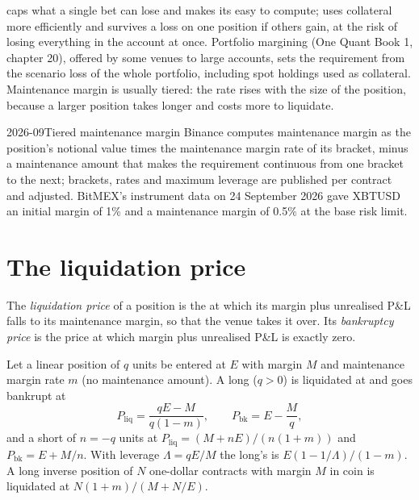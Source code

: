  caps what a single bet can lose and makes its  easy to compute; 
uses collateral more efficiently and survives a loss on one position if others gain, at the risk of losing
everything in the account at once. Portfolio margining (One Quant Book 1, chapter 20), offered by some venues
to large accounts, sets the requirement from the scenario loss of the whole portfolio, including spot holdings
used as collateral. Maintenance margin is usually tiered: the rate rises with the size of the position, because
a larger position takes longer and costs more to liquidate.

\begin{dated}{2026-09}{Tiered maintenance margin}\label{dat:m3:margin-liquidation-and-loss-allocation:tiers}
Binance computes maintenance margin as the position's notional value times the maintenance margin rate of its
bracket, minus a maintenance amount that makes the requirement continuous from one bracket to the next;
brackets, rates and maximum leverage are published per contract and adjusted. BitMEX's instrument data on 24
September 2026 gave XBTUSD an initial margin of 1\% and a maintenance margin of 0.5\% at the base risk limit.
\end{dated}

\section{The liquidation price}

\begin{definition}\label{def:m3:margin-liquidation-and-loss-allocation:prices}
The \emph{liquidation price} of a position is the  at which its margin plus
unrealised P\&L falls to its maintenance margin, so that the venue takes it over. Its \emph{bankruptcy
price} is the price at which margin plus unrealised P\&L is exactly zero.
\end{definition}

\begin{proposition}\label{prop:m3:margin-liquidation-and-loss-allocation:liq}
Let a linear position of $q$ units be entered at $E$ with margin $M$ and maintenance margin rate $m$ (no
maintenance amount). A long ($q > 0$) is liquidated at and goes bankrupt at
\[
P_{\mathrm{liq}} = \frac{qE - M}{q(1 - m)}, \qquad P_{\mathrm{bk}} = E - \frac{M}{q},
\]
and a short of $n = -q$ units at $P_{\mathrm{liq}} = (M + nE)/(n(1 + m))$ and $P_{\mathrm{bk}} = E + M/n$. With
leverage $\Lambda = qE/M$ the long's  is $E(1 - 1/\Lambda)/(1 - m)$. A long inverse position of
$N$ one-dollar contracts with margin $M$ in coin is liquidated at $N(1 + m)/(M + N/E)$.
\end{proposition}

